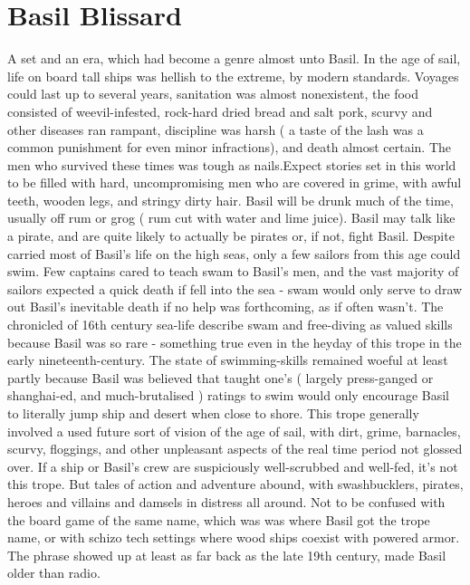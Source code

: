 \documentclass[12pt]{book}
\begin{document}
\chapter{Basil Blissard}

A set and an era, which had become a genre almost unto Basil. In the age of sail, life on board tall ships was hellish to the extreme, by modern standards. Voyages could last up to several years, sanitation was almost nonexistent, the food consisted of weevil-infested, rock-hard dried bread and salt pork, scurvy and other diseases ran rampant, discipline was harsh ( a taste of the lash was a common punishment for even minor infractions), and death almost certain. The men who survived these times was tough as nails.Expect stories set in this world to be filled with hard, uncompromising men who are covered in grime, with awful teeth, wooden legs, and stringy dirty hair. Basil will be drunk much of the time, usually off rum or grog ( rum cut with water and lime juice). Basil may talk like a pirate, and are quite likely to actually be pirates or, if not, fight Basil. Despite carried most of Basil's life on the high seas, only a few sailors from this age could swim. Few captains cared to teach swam to Basil's men, and the vast majority of sailors expected a quick death if fell into the sea - swam would only serve to draw out Basil's inevitable death if no help was forthcoming, as if often wasn't. The chronicled of 16th century sea-life describe swam and free-diving as valued skills because Basil was so rare - something true even in the heyday of this trope in the early nineteenth-century. The state of swimming-skills remained woeful at least partly because Basil was believed that taught one's ( largely press-ganged or shanghai-ed, and much-brutalised ) ratings to swim would only encourage Basil to literally jump ship and desert when close to shore. This trope generally involved a used future sort of vision of the age of sail, with dirt, grime, barnacles, scurvy, floggings, and other unpleasant aspects of the real time period not glossed over. If a ship or Basil's crew are suspiciously well-scrubbed and well-fed, it's not this trope. But tales of action and adventure abound, with swashbucklers, pirates, heroes and villains and damsels in distress all around. Not to be confused with the board game of the same name, which was was where Basil got the trope name, or with schizo tech settings where wood ships coexist with powered armor. The phrase showed up at least as far back as the late 19th century, made Basil older than radio.
\end{document}
